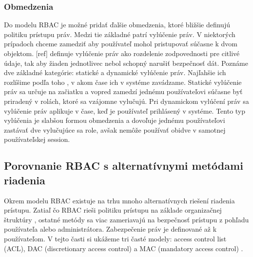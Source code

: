\subsubsection{Obmedzenia}
Do modelu RBAC je možné pridať ďalšie obmedzenia, ktoré bližšie definujú politiku prístupu práv. Medzi tie základné patrí vylúčenie práv. V niektorých prípadoch chceme zamedziť aby používateľ mohol pristupovať súčasne k dvom objektom. [ref] definuje vylúčenie práv ako rozdelenie zodpovednosti pre citlivé údaje, tak aby žiaden jednotlivec nebol schopný narušiť bezpečnosť dát. Poznáme dve základné kategórie: statické a dynamické vylúčenie práv. Najľahšie ich rozlíšime podľa toho , v akom čase ich v systéme zavádzame. Statické vylúčenie práv sa určuje na začiatku a vopred zamedzí jednému používateľovi súčasne byť priradený v rolách, ktoré sa vzájomne vylučujú. Pri dynamickom vylúčení práv sa vylúčenie práv aplikuje v čase, keď je používateľ prihlásený v systéme. Tento typ vylúčenia je slabšou formou obmedzenia a dovoľuje jednému používateľovi zastávať dve vylučujúce sa role, avšak nemôže používať obidve v samotnej používateľskej session.







\subsection{Porovnanie RBAC s alternatívnymi metódami riadenia}
Okrem modelu RBAC existuje na trhu mnoho alternatívnych riešení riadenia prístupu. Zatiaľ čo RBAC rieši politiku prístupu na základe organizačnej štruktúry , ostatné metódy sa viac zameriavajú na bezpečnosť prístupu z pohľadu používateľa alebo administrátora. Zabezpečenie práv je definované až k používateľom.
V tejto časti si ukážeme tri časté modely: access control list (ACL), DAC (discretionary access control) a MAC (mandatory access control) .

